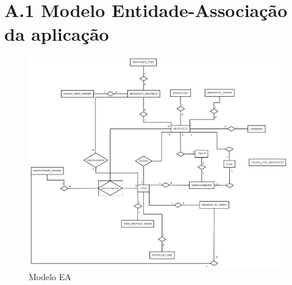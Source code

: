 \documentclass[a4paper,openright,11pt]{report}
\begin{document}
\chapter*{A.1 Modelo Entidade-Associação da aplicação}
\begin{figure}[H]
  \centering 
  \includegraphics[angle=-90,origin=c, scale=0.4]{figures/ModeloEA.png}
  \caption{Modelo EA}\label{anexo:modeloEA}
\end{figure}
\end{document}
